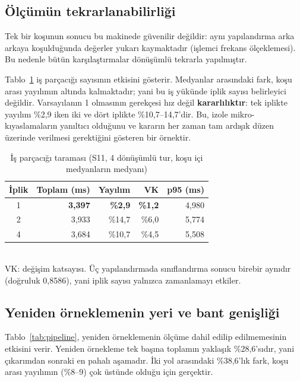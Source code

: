 \documentclass[conference]{IEEEtran}
\begin{document}
\subsection{Ölçümün tekrarlanabilirliği}
\label{sec:tekrar}

Tek bir koşunun sonucu bu makinede güvenilir değildir: aynı yapılandırma arka
arkaya koşulduğunda değerler yukarı kaymaktadır (işlemci frekans ölçeklemesi).
Bu nedenle bütün karşılaştırmalar dönüşümlü tekrarla yapılmıştır.

Tablo~\ref{tab:iplik} iş parçacığı sayısının etkisini gösterir. Medyanlar
arasındaki fark, koşu arası yayılımın altında kalmaktadır; yani bu iş yükünde
iplik sayısı belirleyici değildir. Varsayılanın 1 olmasının gerekçesi hız değil
\textbf{kararlılıktır}: tek iplikte yayılım \%2{,}9 iken iki ve dört iplikte
\%10{,}7--14{,}7'dir. Bu, izole mikro-kıyaslamaların yanıltıcı olduğunu ve
kararın her zaman tam ardışık düzen üzerinde verilmesi gerektiğini gösteren bir
örnektir.

\begin{table}[t]
\caption{İş parçacığı taraması (S11, 4 dönüşümlü tur, koşu içi medyanların
medyanı)}
\label{tab:iplik}
\centering
\small
\begin{tabular}{crrrr}
\toprule
\textbf{İplik} & \textbf{Toplam (ms)} & \textbf{Yayılım} & \textbf{VK} & \textbf{p95 (ms)}\\
\midrule
1 & \textbf{3{,}397} & \textbf{\%2{,}9} & \textbf{\%1{,}2} & 4{,}980\\
2 & 3{,}933 & \%14{,}7 & \%6{,}0 & 5{,}774\\
4 & 3{,}684 & \%10{,}7 & \%4{,}5 & 5{,}508\\
\bottomrule
\end{tabular}
\\[2pt]
\footnotesize VK: değişim katsayısı. Üç yapılandırmada sınıflandırma sonucu
birebir aynıdır (doğruluk 0{,}8586), yani iplik sayısı yalnızca zamanlamayı
etkiler.
\end{table}

\subsection{Yeniden örneklemenin yeri ve bant genişliği}

Tablo~\ref{tab:pipeline}, yeniden örneklemenin ölçüme dahil edilip
edilmemesinin etkisini verir. Yeniden örnekleme tek başına toplamın yaklaşık
\%28{,}6'sıdır, yani çıkarımdan sonraki en pahalı aşamadır. İki yol arasındaki
\%38{,}6'lık fark, koşu arası yayılımın (\%8--9) çok üstünde olduğu için
gerçektir.
\end{document}

